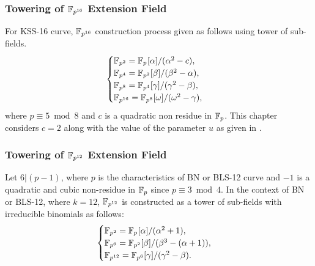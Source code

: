 \subsubsection{Towering of \texorpdfstring{$\mathbb{F}_{p^{16}}$}{} Extension Field}
 For KSS-16 curve, $\mathbb{F}_{p^{16}}$ construction process given as follows using tower of sub-fields. 
\begin{equation}\label{towering}
\begin{cases}
{\mathbb{F}}_{p^{2}} = {\mathbb{F}}_{p^{}}[\alpha]/(\alpha^2-c),  \\ 
{\mathbb{F}}_{p^{4}} = {\mathbb{F}}_{p^{2}}[\beta]/(\beta^2-\alpha),  \\ 
{\mathbb{F}}_{p^{8}} = {\mathbb{F}}_{p^{4}}[\gamma]/(\gamma^2-\beta), \\ 
{\mathbb{F}}_{p^{16}} = {\mathbb{F}}_{p^{8}}[\omega]/(\omega^2-\gamma), \\ 
\end{cases}
\end{equation}
where  $p \equiv 5 \bmod 8$  and $c$ is a quadratic non residue in ${\mathbb{F}}_{p}$. This chapter considers  $c = 2$ along with the value of 
the parameter $u$ as given in \cite{EPRINT:BarDuq17}. 

\subsubsection{Towering of \texorpdfstring{$\mathbb{F}_{p^{12}}$}{} Extension Field}
Let $6|(p-1)$, where $p$ is the characteristics of BN or BLS-12 curve and $-1$ is a quadratic and cubic non-residue in ${\mathbb{F}}_{p}$ since $p \equiv 3 \bmod 4$. 
In the context of BN or BLS-12, where $k=12$, $\mathbb{F}_{p^{12}}$ is constructed as  a tower of sub-fields with irreducible binomials as follows:
\begin{equation}\label{BN_towering}
\begin{cases}
{\mathbb{F}}_{p^{2}} = {\mathbb{F}}_{p^{}}[\alpha]/(\alpha^2+1),  \\ 
{\mathbb{F}}_{p^{6}} = {\mathbb{F}}_{p^{2}}[\beta]/(\beta^3-(\alpha+1)),  \\ 
{\mathbb{F}}_{p^{12}} = {\mathbb{F}}_{p^{6}}[\gamma]/(\gamma^2-\beta). \\ 
\end{cases}
\end{equation}

